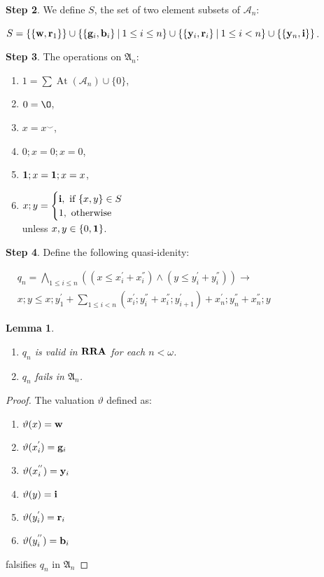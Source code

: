 \documentclass[a4paper]{article}
\theoremstyle{defin}
\theoremstyle{theorem}
\theoremstyle{prop}
\theoremstyle{lemma}
\newtheorem{lemma}{Lemma}
\theoremstyle{ex}
\theoremstyle{col}
\begin{document}
{\bf Step 2}. We define $S$, the set of two element subsets of $\mathcal{A}_n$:
\begin{center}
  $S = \{ \{ {\bf w}, {\bf r}_1 \} \} \cup \{ \{ {\bf g}_i, {\bf b}_i \} \: | \: 1 \leq i \leq n \} \cup
  \{ \{ {\bf y}_i, {\bf r}_i \} \: | \: 1 \leq i < n \} \cup \{ \{ {\bf y}_n, {\bf i}\} \}$.
\end{center}

{\bf Step 3}. The operations on $\mathfrak{A}_n$:
\begin{enumerate}
  \item $1 = \sum \operatorname{At}(\mathcal{A}_n) \cup \{ 0 \}$,
  \item $0 = \O$,
  \item $x = x^{\smile}$,
  \item $0 ; x = 0 ; x = 0$,
  \item ${\bf 1} ; x = {\bf 1} ; x = x$,
  \item $x ; y = \begin{cases} {\bf i}, \text{ if $\{x, y\} \in S$} \\ 1, \text{ otherwise } \end{cases}$ \\ unless $x, y \in \{ 0, {\bf 1}\}$.
\end{enumerate}

{\bf Step 4}. Define the following quasi-idenity:
\begin{center}
  $\begin{array}{lll}
  & q_n = \bigwedge \limits_{1 \leq i \leq n} ( (x \leq x^{'}_i + x^{''}_i) \land (y \leq y^{'}_i + y^{''}_i)) \to & \\
  & x ; y \leq x ; y^{'}_1 + \sum \limits_{1 \leq i < n} (x^{'}_i ; y^{''}_i + x^{''}_i ; y^{'}_{i + 1}) + x^{'}_n ; y^{''}_n + x^{''}_n ; y&
  \end{array}$
\end{center}

\begin{lemma}

  \begin{enumerate}
    \item $q_n$ is valid in ${\bf RRA}$ for each $n < \omega$.
    \item $q_n$ fails in $\mathfrak{A}_n$.
  \end{enumerate}
\end{lemma}

\begin{proof}
  The valuation $\vartheta$ defined as:
  \begin{enumerate}
    \item $\vartheta(x) = {\bf w}$
    \item $\vartheta(x_i^{'}) = {\bf g}_i$
    \item $\vartheta(x_i^{''}) = {\bf y}_i$
    \item $\vartheta(y) = {\bf i}$
    \item $\vartheta(y_i^{'}) = {\bf r}_i$
    \item $\vartheta(y_i^{''}) = {\bf b}_i$
  \end{enumerate}
  falsifies $q_n$ in $\mathfrak{A}_n$
\end{proof}
\end{document}
